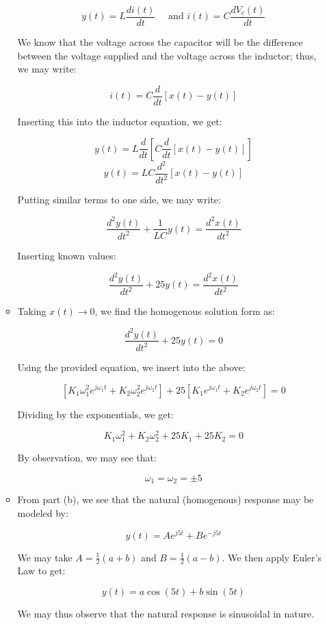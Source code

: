 \begin{enumerate}
\begin{itemize}
        $$y(t)=L\frac{di(t)}{dt}\quad\text{ and }i(t)=C\frac{dV_c(t)}{dt}$$

        We know that the voltage across the capacitor will be the difference between the voltage supplied and the voltage across the inductor; thus, we may write:

        $$i(t)=C\frac{d}{dt}\left[ x(t)-y(t) \right]$$

        Inserting this into the inductor equation, we get:

        $$y(t)=L\frac{d}{dt}\left[ C\frac{d}{dt}\left[ x(t)-y(t) \right] \right]$$
        $$y(t)=LC\frac{d^2}{dt^2}\left[x(t)-y(t) \right]$$

        Putting similar terms to one side, we may write:

        $$\frac{d^2y(t)}{dt^2}+\frac{1}{LC}y(t)=\frac{d^2x(t)}{dt^2}$$

        Inserting known values:

        $$\boxed{\frac{d^2y(t)}{dt^2}+25y(t)=\frac{d^2x(t)}{dt^2}}$$

      \item 

        Taking $x(t)\to0$, we find the homogenous solution form as:

        $$\frac{d^2y(t)}{dt^2}+25y(t)=0$$

        Using the provided equation, we insert into the above:

        $$\left[ K_1\omega_1^2e^{j\omega_1 t}+K_2\omega_2^2e^{j\omega_2t} \right]+25\left[ K_1e^{j\omega_1 t}+K_2e^{j\omega_2t} \right]=0$$

        Dividing by the exponentials, we get:

        $$K_1\omega_1^2+K_2\omega_2^2+25K_1+25K_2=0$$

        By observation, we may see that:

        $$\boxed{\omega_1=\omega_2=\pm5}$$

      \item 

        From part (b), we see that the natural (homogenous) response may be modeled by:

        $$y(t)=Ae^{j5t}+Be^{-j5t}$$

        We may take $A=\frac{1}{2}(a+b)$ and $B=\frac{1}{2}(a-b)$. We then apply Euler's Law to get:

        $$\boxed{y(t)=a\cos(5t)+b\sin(5t)}$$

        We may thus observe that the natural response is sinusoidal in nature.

    \end{itemize}

\end{enumerate}



